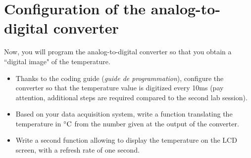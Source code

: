 \documentclass[11pt,a4paper]{article}
\theoremstyle{definition}%
\begin{document}



\section{Configuration of the analog-to-digital converter}
Now, you will program the analog-to-digital converter so that you obtain a ``digital image" of the temperature.
\begin{itemize}
	\item Thanks to the coding guide (\textit{guide de programmation}), configure the converter so that the temperature value is digitized every 10ms (pay attention, additional steps are required compared to the second lab session).
	\item Based on your data acquisition system, write a function translating the temperature in $\celsius$ from the number given at the output of the converter.
	\item Write a second function allowing to display the temperature on the LCD screen, with a refresh rate of one second.
\end{itemize}






\end{document}
